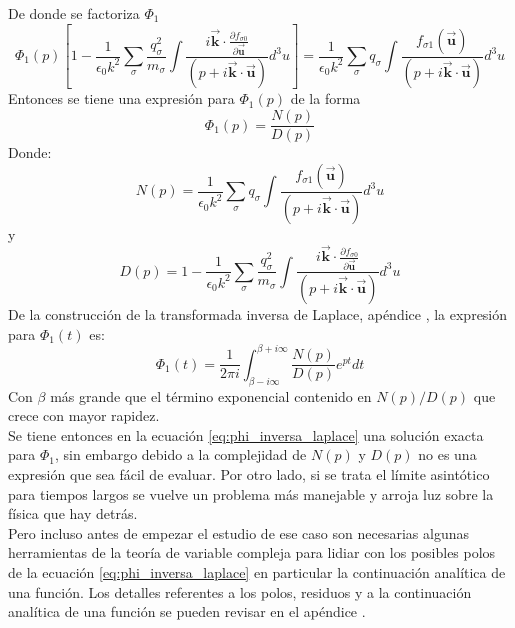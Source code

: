 \documentclass[../tesis_main_file.tex]{subfiles}
\begin{document}
De donde se factoriza $\Phi_1$ 
\begin{equation}
\Phi _1 (p)\left[1-\frac{1}{\epsilon_0 k^2}\sum_{\sigma}\frac{q_{\sigma}^2}{m_{\sigma}}\int  \frac{i\overrightarrow{\textbf{k}}\cdot \frac{\partial f_{\sigma 0}}{\partial \overrightarrow{\textbf{u}}}}{(p + i\overrightarrow{\textbf{k}}\cdot \overrightarrow{\textbf{u}})}d^3u \right]=\frac{1}{\epsilon_0 k^2}\sum_{\sigma}q_{\sigma}\int \frac{f_{\sigma 1}(\overrightarrow{\textbf{u}})}{(p + i\overrightarrow{\textbf{k}}\cdot \overrightarrow{\textbf{u}})}d^3u
\end{equation}
Entonces se tiene una expresión para $\Phi_1(p)$ de la forma
\begin{equation}
\label{eq:phi_num_y_denominador}
\Phi_1(p)=\frac{N(p)}{D(p)}
\end{equation}
Donde:
\begin{equation}
\label{eq:funcion_numerador}
N(p)=\frac{1}{\epsilon_0 k^2}\sum_{\sigma}q_{\sigma}\int \frac{f_{\sigma 1}(\overrightarrow{\textbf{u}})}{(p + i\overrightarrow{\textbf{k}}\cdot \overrightarrow{\textbf{u}})}d^3u
\end{equation}
y
\begin{equation}
\label{eq:funcion_denominador}
D(p)=1-\frac{1}{\epsilon_0 k^2}\sum_{\sigma}\frac{q_{\sigma}^2}{m_{\sigma}}\int  \frac{i\overrightarrow{\textbf{k}}\cdot \frac{\partial f_{\sigma 0}}{\partial \overrightarrow{\textbf{u}}}}{(p + i\overrightarrow{\textbf{k}}\cdot \overrightarrow{\textbf{u}})}d^3u
\end{equation}
De la construcción de la transformada inversa de Laplace, apéndice \notinsubfile{\ref{Ap:Laplace}}, la expresión para $\Phi _1(t)$ es:
\begin{equation}
\label{eq:phi_inversa_laplace}
\Phi_1(t) =\frac{1}{2\pi i}\int ^{\beta +i \infty}_{\beta - i\infty} \frac{N(p)}{D(p)}e^{pt}dt
\end{equation}
Con $\beta$ más grande que el término exponencial contenido en $N(p)/D(p)$ que crece con mayor rapidez.\\
Se tiene entonces en la ecuación \ref{eq:phi_inversa_laplace} una solución exacta para $\Phi_1$, sin embargo debido a la complejidad de $N(p)$ y $D(p)$ no es una expresión que sea fácil de evaluar. Por otro lado, si se trata el límite asintótico para tiempos largos se vuelve un problema más manejable y arroja luz sobre la física que hay detrás.\\
Pero incluso antes de empezar el estudio de ese caso son necesarias algunas herramientas de la teoría de variable compleja para lidiar con los posibles polos de la ecuación \ref{eq:phi_inversa_laplace} en particular la continuación analítica de una función. Los detalles referentes a los polos, residuos y a la continuación analítica de una función se pueden revisar en el apéndice \notinsubfile{\ref{Ap:temas_Var_compleja}}.\\
\end{document}
